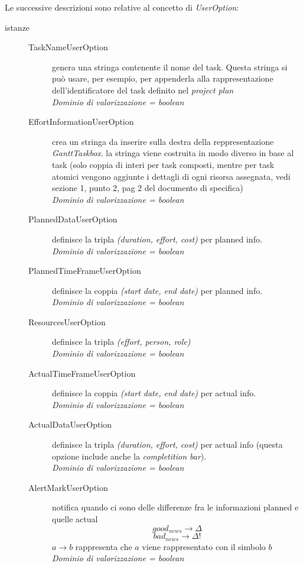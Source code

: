 Le successive descrizioni sono relative al concetto di \emph{UserOption}:
\begin{description}
  \item[istanze]\quad
  \begin{description}
	\item[TaskNameUserOption] genera una stringa contenente il nome del task.
	Questa stringa si pu\`o usare, per esempio, per appenderla alla
	rappresentazione dell'identificatore del task definito nel \emph{project plan}
	\\ \emph{Dominio di valorizzazione = boolean}
	\item[EffortInformationUserOption] crea un stringa da inserire sulla destra
	della reppresentazione \emph{GanttTaskbox}. la stringa viene costruita in modo
	diverso in base al task (solo coppia di interi per task composti, mentre per
	task atomici vengono aggiunte i dettagli di ogni risorsa assegnata, vedi
	sezione 1, punto 2, pag 2 del documento di specifica)
	\\ \emph{Dominio di valorizzazione = boolean}
	\item[PlannedDataUserOption] definisce la tripla \emph{(duration, effort,
	cost)} per planned info.
	\\ \emph{Dominio di valorizzazione = boolean}
	\item[PlannedTimeFrameUserOption] definisce la coppia \emph{(start date, end
	date)} per planned info.
	\\ \emph{Dominio di valorizzazione = boolean}
	\item[ResourcesUserOption] definisce la tripla \emph{(effort, person, role)}
	\\ \emph{Dominio di valorizzazione = boolean}
	\item[ActualTimeFrameUserOption] definisce la coppia \emph{(start date, end
	date)} per actual info.
	\\ \emph{Dominio di valorizzazione = boolean}
	\item[ActualDataUserOption] definisce la tripla \emph{(duration, effort,
	cost)} per actual info (questa opzione include anche la \emph{completition
	bar}).
	\\ \emph{Dominio di valorizzazione = boolean}
	\item[AlertMarkUserOption] notifica quando ci sono delle differenze fra le
	informazioni planned e quelle actual
	$$good_{news} \rightarrow
 \Delta$$$$bad_{news} \rightarrow \Delta!$$ $a \rightarrow b$ rappresenta che
 $a$ viene rappresentato con il simbolo $b$
 	\\ \emph{Dominio di valorizzazione = boolean}

\end{description}
\end{description}
